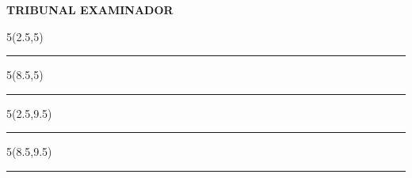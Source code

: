 \newpage
\thispagestyle{empty}
\begin{center}
   \textbf{TRIBUNAL EXAMINADOR} 

    \begin{textblock}{5}(2.5,5)
    \noindent\rule{6.5cm}{0.4pt}
    \end{textblock}
    
    \begin{textblock}{5}(8.5,5)
    \noindent\rule{6.5cm}{0.4pt}
    \end{textblock}
    
    \begin{textblock}{5}(2.5,9.5)
    \noindent\rule{6.5cm}{0.4pt}
    \end{textblock}
    
    \begin{textblock}{5}(8.5,9.5)
    \noindent\rule{6.5cm}{0.4pt}
    \end{textblock}

\end{center}
